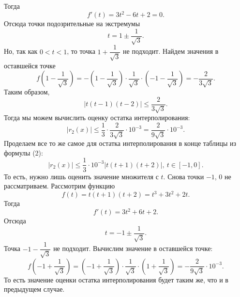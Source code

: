 \documentclass[a4paper, 12pt]{article}
\renewcommand{\leq}{\leqslant}
\begin{document}
\begin{enumerate}
	Тогда $$f'(t) = 3t^2 - 6t + 2=0.$$
	Отсюда точки подозрительные на экстремумы $$t = 1\pm \dfrac{1}{\sqrt 3}.$$
	Но, так как $0<t<1$, то точка $1 + \dfrac{1}{\sqrt3}$ не подходит.
	Найдем значения в оставшейся точке
	$$f\left(1- \dfrac{1}{\sqrt 3}\right) = -\left(1- \dfrac{1}{\sqrt 3}\right)\cdot \dfrac{1}{\sqrt 3} \cdot \left(-1- \dfrac{1}{\sqrt 3}\right) = -\dfrac{2}{3\sqrt3}.$$
	Таким образом, $$\left|t(t-1)(t-2)\right|\leq \dfrac{2}{3\sqrt3}.$$
	Тогда мы можем вычислить оценку остатка интерполирования:
	$$|r_2(x)| \leq \dfrac{1}{3}\cdot \dfrac{2}{3\sqrt3}\cdot10^{-3}=\dfrac{2}{9\sqrt3}\cdot10^{-3}.$$
	Проделаем все то же самое для остатка интерполирования в конце таблицы из формулы (2): $$|r_2(x)| \leq \dfrac{1}{3}\cdot10^{-3}\left|t(t+1)(t+2)\right|,\ t\in [-1,0].$$
	То есть, нужно лишь оценить значение множителя с $t$. Снова точки $-1$, $0$ не рассматриваем. Рассмотрим функцию $$f(t) = t(t+1)(t+2) = t^3 + 3t^2 + 2t.$$
	Тогда $$f'(t) = 3t^2 + 6t + 2.$$
	Отсюда $$t = -1 \pm \dfrac{1}{\sqrt3}.$$
	Точка $-1 - \dfrac{1}{\sqrt3}$ не подходит. Вычислим значение в оставшейся точке: $$f\left(-1 + \dfrac{1}{\sqrt3}\right) = \left(-1 + \dfrac{1}{\sqrt3}\right)\cdot \dfrac{1}{\sqrt3}\cdot \left(1 + \dfrac{1}{\sqrt3}\right) = -\dfrac{2}{9\sqrt3}\cdot10^{-3}.$$
	То есть значение оценки остатка интерполирования будет таким же, что и в предыдущем случае.
	

\end{enumerate}
\end{document}
